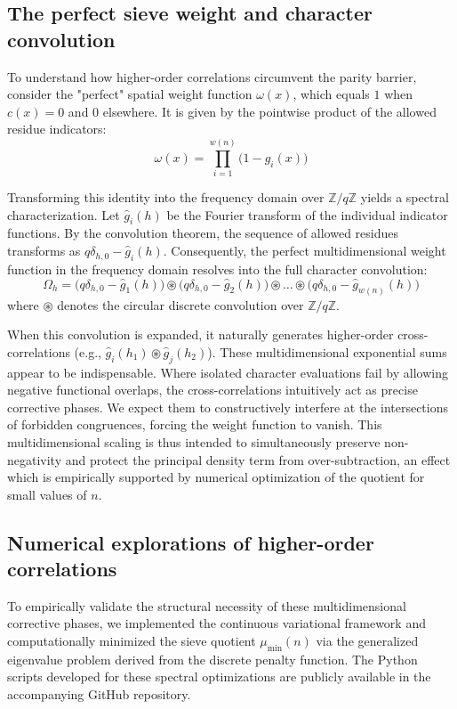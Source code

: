 \documentclass[reqno,notitlepage]{amsart}
\begin{document}
\subsection{The perfect sieve weight and character convolution}

To understand how higher-order correlations circumvent the parity barrier, consider the "perfect"
spatial weight function $\omega(x)$, which equals $1$ when $c(x) = 0$ and $0$ elsewhere.
It is given by the pointwise product of the allowed residue indicators:
\[ \omega(x) = \prod_{i=1}^{w(n)} \big(1 - g_i(x)\big) \]

Transforming this identity into the frequency domain over $\mathbb{Z}/q\mathbb{Z}$
yields a spectral characterization. Let $\hat{g}_i(h)$ be the Fourier transform
of the individual indicator functions. By the convolution theorem, the sequence of allowed
residues transforms as $q\delta_{h,0} - \hat{g}_i(h)$. Consequently, the
perfect multidimensional weight function in the frequency domain resolves into the full
character convolution:
\[ \Omega_h = \big(q\delta_{h,0} - \hat{g}_1(h)\big) \circledast \big(q\delta_{h,0} - \hat{g}_2(h)\big) \circledast \dots \circledast \big(q\delta_{h,0} - \hat{g}_{w(n)}(h)\big) \]
where $\circledast$ denotes the circular discrete convolution over $\mathbb{Z}/q\mathbb{Z}$.

When this convolution is expanded, it naturally generates higher-order cross-correlations (e.g.,
$\hat{g}_i(h_1) \circledast \hat{g}_j(h_2)$). These multidimensional exponential sums appear to be
indispensable. Where isolated character evaluations fail by allowing negative functional overlaps, the
cross-correlations intuitively act as precise corrective phases. We expect them to constructively
interfere at the intersections of forbidden congruences, forcing the weight function to vanish. This
multidimensional scaling is thus intended to simultaneously preserve non-negativity and protect
the principal density term from over-subtraction, an effect which is empirically supported by
numerical optimization of the quotient for small values of $n$.

\subsection{Numerical explorations of higher-order correlations}

To empirically validate the structural necessity of these multidimensional corrective phases, we
implemented the continuous variational framework and computationally minimized the sieve quotient
$\mu_{\min}(n)$ via the generalized eigenvalue problem derived from the discrete penalty function.
The Python scripts developed for these spectral optimizations are publicly available in the
accompanying GitHub repository.
\end{document}
